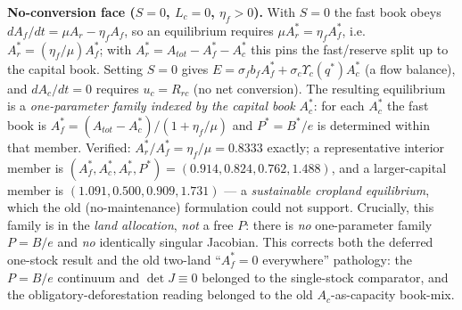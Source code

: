 \documentclass[11pt]{article}
\begin{document}
\noindent\textbf{No-conversion face ($S=0$, $L_c=0$, $\eta_f>0$).} With $S=0$ the fast book obeys $dA_f/dt=\mu A_r-\eta_f A_f$, so an equilibrium requires $\mu A_r^*=\eta_f A_f^*$, i.e.\ $A_r^*=(\eta_f/\mu)A_f^*$; with $A_r^*=A_{tot}-A_f^*-A_c^*$ this pins the fast/reserve split up to the capital book. Setting $S=0$ gives $E=\sigma_f b_f A_f^*+\sigma_c\Upsilon_c(q^*)A_c^*$ (a flow balance), and $dA_c/dt=0$ requires $u_c=R_{rc}$ (no net conversion). The resulting equilibrium is a \emph{one-parameter family indexed by the capital book} $A_c^*$: for each $A_c^*$ the fast book is $A_f^*=(A_{tot}-A_c^*)/(1+\eta_f/\mu)$ and $P^*=B^*/e$ is determined within that member. Verified: $A_r^*/A_f^*=\eta_f/\mu=0.8333$ exactly; a representative interior member is $(A_f^*,A_c^*,A_r^*,P^*)=(0.914,0.824,0.762,1.488)$, and a larger-capital member is $(1.091,0.500,0.909,1.731)$ --- a \emph{sustainable cropland equilibrium}, which the old (no-maintenance) formulation could not support. Crucially, this family is in the \emph{land allocation}, \emph{not} a free $P$: there is \emph{no} one-parameter family $P=B/e$ and \emph{no} identically singular Jacobian. This corrects both the deferred one-stock result and the old two-land ``$A_f^*=0$ everywhere'' pathology: the $P=B/e$ continuum and $\det J\equiv0$ belonged to the single-stock comparator, and the obligatory-deforestation reading belonged to the old $A_c$-as-capacity book-mix.
\end{document}
